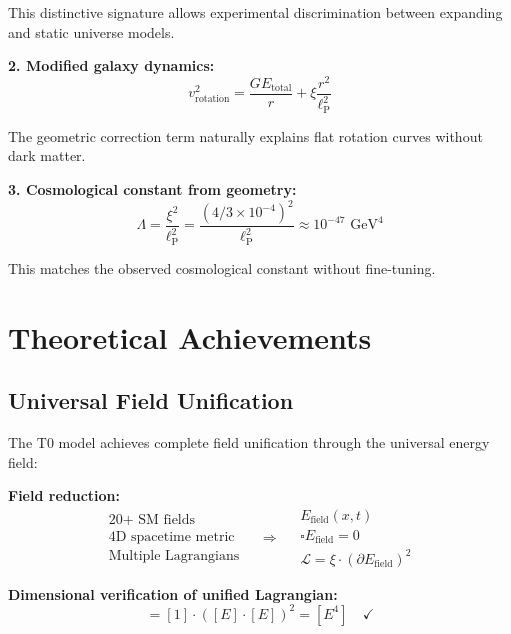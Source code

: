 \documentclass[12pt,a4paper]{report}
\newcommand{\lP}{\ell_{\text{P}}}         %
\begin{document}
This distinctive signature allows experimental discrimination between expanding and static universe models.

\textbf{2. Modified galaxy dynamics:}
\begin{equation}
	v_{\text{rotation}}^2 = \frac{GE_{\text{total}}}{r} + \xi \frac{r^2}{\lP^2}
\end{equation}

The geometric correction term naturally explains flat rotation curves without dark matter.

\textbf{3. Cosmological constant from geometry:}
\begin{equation}
	\Lambda = \frac{\xi^2}{\lP^2} = \frac{(4/3 \times 10^{-4})^2}{\lP^2} \approx 10^{-47} \text{ GeV}^4
\end{equation}

This matches the observed cosmological constant without fine-tuning.

\section{Theoretical Achievements}
\label{sec:theoretical_achievements}

\subsection{Universal Field Unification}
\label{subsec:universal_field_unification}

The T0 model achieves complete field unification through the universal energy field:

\textbf{Field reduction:}
\begin{equation}
	\begin{array}{c}
		\text{20+ SM fields} \\
		\text{4D spacetime metric} \\
		\text{Multiple Lagrangians}
	\end{array} \quad \Rightarrow \quad
	\begin{array}{c}
		E_{\text{field}}(x,t) \\
		\square E_{\text{field}} = 0 \\
		\mathcal{L} = \xi \cdot (\partial E_{\text{field}})^2
	\end{array}
\end{equation}

\textbf{Dimensional verification of unified Lagrangian:}
\begin{equation}
	[\mathcal{L}] = [1] \cdot ([E] \cdot [E])^2 = [E^4] \quad \checkmark
\end{equation}
\end{document}
